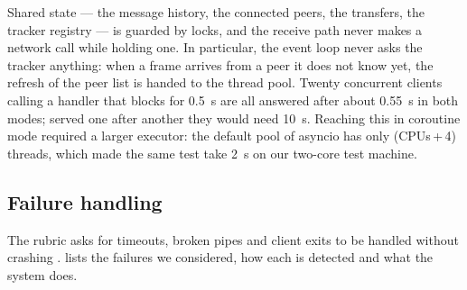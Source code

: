 Shared state --- the message history, the connected peers, the transfers, the tracker registry --- is
guarded by locks, and the receive path never makes a network call while holding one. In particular,
the event loop never asks the tracker anything: when a frame arrives from a peer it does not know
yet, the refresh of the peer list is handed to the thread pool. Twenty concurrent clients calling a
handler that blocks for \SI{0.5}{s} are all answered after about \SI{0.55}{s} in both modes; served
one after another they would need \SI{10}{s}. Reaching this in coroutine mode required a larger
executor: the default pool of asyncio has only (CPUs\,+\,4) threads, which made the same test take
\SI{2}{s} on our two-core test machine.

\subsection{Failure handling}
The rubric asks for timeouts, broken pipes and client exits to be handled without crashing
\cite{brief1}.  lists the failures we considered, how each is detected and what the
system does.

